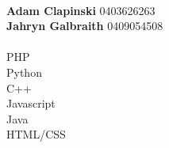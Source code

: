 \documentclass[9pt]{developercv}
\newcommand{\CC}{C\nolinebreak\hspace{-.05em}\raisebox{.4ex}{\tiny\bf +}\nolinebreak\hspace{-.10em}\raisebox{.4ex}{\tiny\bf +}}
\def\CC{{C\nolinebreak[4]\hspace{-.05em}\raisebox{.4ex}{\tiny\bf ++}}}
\begin{document}
	\begin{minipage}[t]{0.3\textwidth}
		\\
		\textbf{Adam Clapinski} 0403626263\\
		\textbf{Jahryn Galbraith} 0409054508\\

		\\
		{PHP}\\
		{Python}\\
		{C++}\\
		{Javascript}\\
		{Java}\\
		{HTML/CSS}\\

		

	\end{minipage}
\end{document}
